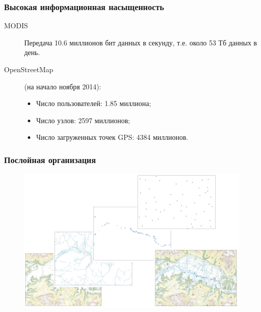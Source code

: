 \begin{frame}
    \frametitle{Высокая информационная насыщенность}
    \begin{description}
        \item[MODIS] Передача 10.6 миллионов бит данных в секунду, т.е. около 53 Тб данных в день.
        \item[OpenStreetMap] (на начало ноября 2014):
            \begin{itemize}
                \item Число пользователей: 1.85 миллиона;
                \item Число узлов: 2597 миллионов;
                \item Число загруженных точек GPS: 4384 миллионов.
            \end{itemize}
    \end{description}
\end{frame}

\begin{frame}
    \frametitle{Послойная организация}
    \begin{figure}[!ht]
        \begin{center}
            \includegraphics[width=0.9\columnwidth]{./introduction/img/layers_map}
        \end{center}
    \end{figure}
\end{frame}


